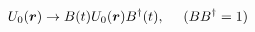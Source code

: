 \begin{equation}
U_0(\mbox{\boldmath$r$}) \rightarrow B(t)U_0(\mbox{\boldmath$r$}) B^\dag(t), ~~~~(BB^\dag=1)  
\end{equation}

